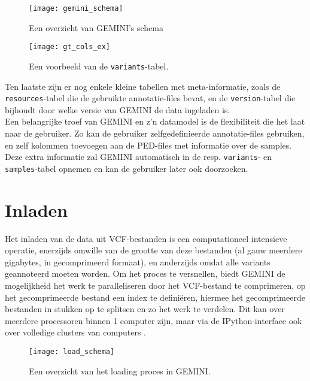 \begin{figure}[!hp]
\begin{adjustwidth}{-0.5in}{}
\texttt{[image: gemini\_schema]}
\caption{Een overzicht van GEMINI's schema \cite{10.1371/journal.pcbi.1003153}}
\label{gemini_schema_pic}
\end{adjustwidth}
\end{figure}

\begin{figure}[!h]
\texttt{[image: gt\_cols\_ex]}
\caption{Een voorbeeld van de \texttt{variants}-tabel.}
\label{gt_cols_ex}
\end{figure}

Ten laatste zijn er nog enkele kleine tabellen met meta-informatie, zoals de \texttt{resources}-tabel die de gebruikte annotatie-files bevat, en de \texttt{version}-tabel die bijhoudt door welke versie van GEMINI de data ingeladen is.\\

Een belangrijke troef van GEMINI en z'n datamodel is de flexibiliteit die het laat naar de gebruiker. Zo kan de gebruiker zelfgedefinieerde annotatie-files gebruiken, en zelf kolommen toevoegen aan de PED-files met informatie over de samples. Deze extra informatie zal GEMINI automatisch in de resp. \texttt{variants}- en \texttt{samples}-tabel opnemen en kan de gebruiker later ook doorzoeken.\\

\section{Inladen}
\label{loading_origineel}
Het inladen van de data uit VCF-bestanden is een computationeel intensieve operatie, enerzijds omwille van de grootte van deze bestanden (al gauw meerdere gigabytes, in gecomprimeerd formaat), en anderzijds omdat alle variants geannoteerd moeten worden. Om het proces te versnellen, biedt GEMINI de mogelijkheid het werk te paralleliseren door het VCF-bestand te comprimeren, op het gecomprimeerde bestand een index te defini\"eren, hiermee het gecomprimeerde bestanden in stukken op te splitsen en zo het werk te verdelen. Dit kan over meerdere processoren binnen 1 computer zijn, maar via de IPython-interface ook over volledige clusters van computers \cite{PER-GRA:2007}.\\

\begin{figure}[!h]
\texttt{[image: load\_schema]}
\caption{Een overzicht van het loading proces in GEMINI.}
\label{load_schema}
\end{figure}

